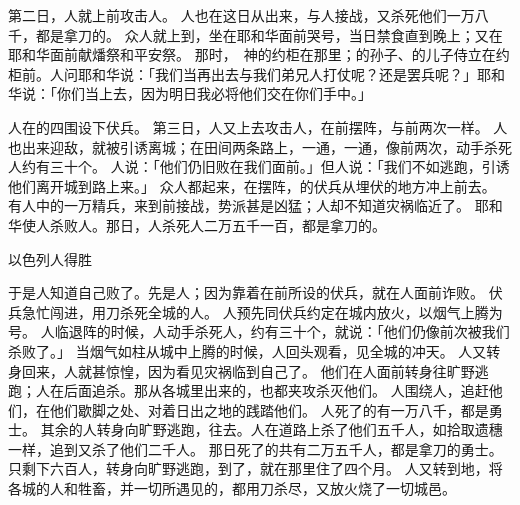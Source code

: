 {\par }{\PP {}第二日，{}人就上前攻击{}人。
人也在这日从{}出来，与{}人接战，又杀死他们一万八千，都是拿刀的。
众人就上到{}，坐在耶和华面前哭号，当日禁食直到晚上；又在耶和华面前献燔祭和平安祭。
那时，　神的约柜在那里；{}的孙子、{}的儿子{}侍立在约柜前。{}人问耶和华说：「我们当再出去与我们弟兄{}人打仗呢？还是罢兵呢？」耶和华说：「你们当上去，因为明日我必将他们交在你们手中。」
\par }{\PP {}人在{}的四围设下伏兵。
第三日，{}人又上去攻击{}人，在{}前摆阵，与前两次一样。
人也出来迎敌，就被引诱离城；在田间两条路上，一通{}，一通{}，像前两次，动手杀死{}人约有三十个。
人说：「他们仍旧败在我们面前。」但{}人说：「我们不如逃跑，引诱他们离开城到路上来。」
众人都起来，在{}摆阵，{}的伏兵从{}埋伏的地方冲上前去。
有{}人中的一万精兵，来到{}前接战，势派甚是凶猛；{}人却不知道灾祸临近了。
耶和华使{}人杀败{}人。那日，{}人杀死{}人二万五千一百，都是拿刀的。
\par }{\SH 以色列人得胜
\par }{\PP {}于是{}人知道自己败了。先是{}人；因为靠着在{}前所设的伏兵，就在{}人面前诈败。
伏兵急忙闯进{}，用刀杀死全城的人。
人预先同伏兵约定在城内放火，以烟气上腾为号。
人临退阵的时候，{}人动手杀死{}人，约有三十个，就说：「他们仍像前次被我们杀败了。」
当烟气如柱从城中上腾的时候，{}人回头观看，见全城的{}冲天。
人又转身回来，{}人就甚惊惶，因为看见灾祸临到自己了。
他们在{}人面前转身往旷野逃跑；{}人在后面追杀。那从各城里出来的，也都夹攻杀灭他们。
人围绕{}人，追赶他们，在他们歇脚之处、对着日出之地的{}践踏他们。
人死了的有一万八千，都是勇士。
其余的人转身向旷野逃跑，往{}去。{}人在道路上杀了他们五千人，如拾取遗穗一样，追到{}又杀了他们二千人。
那日{}死了的共有二万五千人，都是拿刀的勇士。
只剩下六百人，转身向旷野逃跑，到了{}，就在那里住了四个月。
人又转到{}地，将各城的人和牲畜，并一切所遇见的，都用刀杀尽，又放火烧了一切城邑。

}
